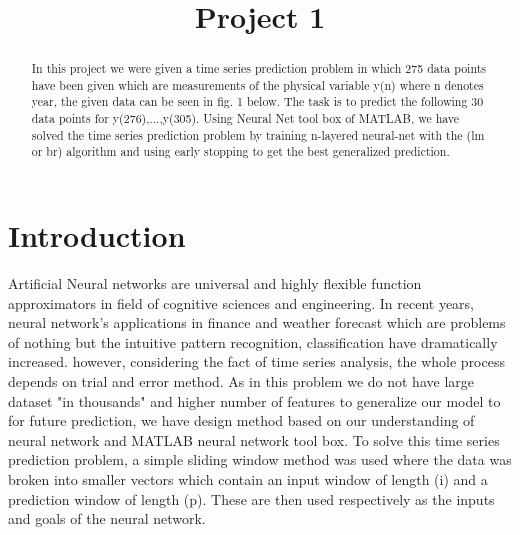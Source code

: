 \documentclass[conference]{IEEEtran}
\begin{document}
\title{Project 1}

\author{
	\and
{}
\and	
{}
	
	
}


\maketitle


\begin{abstract}
In this project we were given a time series prediction problem in which 275 data points have been given which are measurements of the physical variable y(n) where n denotes year, the given data can be seen in fig. 1 below. The task is to predict the following 30 data points for y(276),...,y(305). Using Neural Net tool box of MATLAB, we have solved the time series prediction problem by training n-layered neural-net with the (lm or br) algorithm and using early stopping to get the best generalized prediction.
\end{abstract}

\section{Introduction}
Artificial Neural networks are universal and highly flexible function approximators in field of cognitive sciences and engineering. In recent years, neural network's applications in finance  and weather forecast which are problems of nothing but the intuitive pattern recognition, classification  have dramatically increased. however,  considering the fact of time series analysis,  the whole process depends on trial and error method. As in this problem we do not have large dataset "in thousands" and higher number of features to generalize our model to for future prediction, we have design method based on our understanding of neural network and MATLAB neural network tool box. To solve this time series prediction problem, a simple sliding window method was used where the data was broken into smaller vectors which contain an input window of length (i) and a prediction window of length (p). These are then used respectively as the inputs and goals of the neural network.
\end{document}
